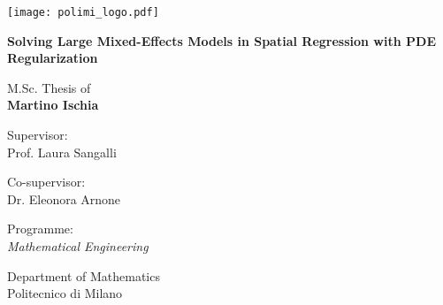 
\newcommand{\myName}{Martino Ischia}
\newcommand{\myTitle}{Solving Large Mixed-Effects Models in Spatial Regression with PDE Regularization}
\newcommand{\myDegree}{Programme: \protect\\ \textit{Mathematical Engineering}}
\newcommand{\myDepartment}{Department of Mathematics}
\newcommand{\myUni}{Politecnico di Milano}
\newcommand{\myYear}{2023}
\newcommand{\myTime}{01 Jul \myYear}

\begin{titlepage}
	\texttt{[image: polimi\_logo.pdf]}
	\begin{addmargin}[3cm]{-1cm}
		\setlength{\parindent}{0pt} \vfill

		{
			\Huge\bfseries\myTitle
			\par
		}

		\vspace{2cm}

		{\Large M.Sc. Thesis of\\[0.125cm]}
		{\LARGE\bfseries\myName}

		\vspace{1cm}

		\large
		Supervisor:\\[0.125cm]
		{\Large Prof. Laura Sangalli}
		\vspace{0.5cm}

		\large
		Co-supervisor:\\[0.125cm]
		{\Large Dr. Eleonora Arnone}

		\vspace{2cm}

		\myDegree

		\vspace{0.5cm}

		\myDepartment \\
		\myUni

		\vfill
	\end{addmargin}
\end{titlepage}
